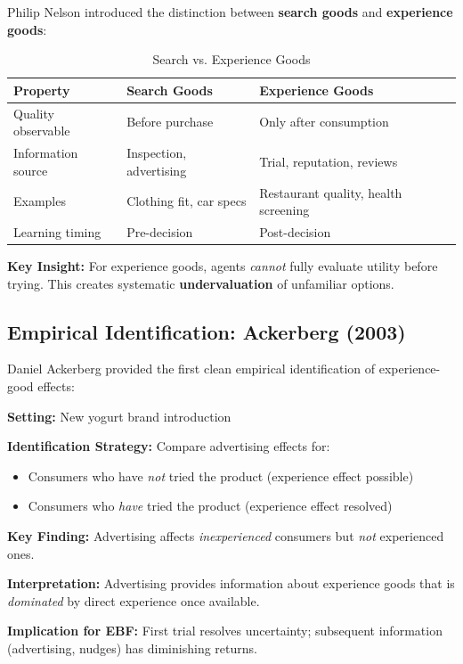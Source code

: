 \documentclass[11pt, a4paper]{article}
\begin{document}
Philip Nelson introduced the distinction between \textbf{search goods} and \textbf{experience goods}:

\begin{table}[htbp]
\centering
\caption{Search vs. Experience Goods}
\label{tab:lrn-search-experience}
\renewcommand{\arraystretch}{1.3}
\begin{tabular}{@{}lll@{}}
\toprule
\textbf{Property} & \textbf{Search Goods} & \textbf{Experience Goods} \\
\midrule
Quality observable & Before purchase & Only after consumption \\
Information source & Inspection, advertising & Trial, reputation, reviews \\
Examples & Clothing fit, car specs & Restaurant quality, health screening \\
Learning timing & Pre-decision & Post-decision \\
\bottomrule
\end{tabular}
\end{table}

\textbf{Key Insight:} For experience goods, agents \textit{cannot} fully evaluate utility before trying. This creates systematic \textbf{undervaluation} of unfamiliar options.

\subsection{Empirical Identification: Ackerberg (2003)}

Daniel Ackerberg provided the first clean empirical identification of experience-good effects:

\begin{tcolorbox}[colback=gray!5!white, colframe=gray!75!black,
    title=Ackerberg (2003): Advertising and Experience Goods]

\textbf{Setting:} New yogurt brand introduction

\textbf{Identification Strategy:} Compare advertising effects for:
\begin{itemize}[nosep]
    \item Consumers who have \textit{not} tried the product (experience effect possible)
    \item Consumers who \textit{have} tried the product (experience effect resolved)
\end{itemize}

\textbf{Key Finding:} Advertising affects \textit{inexperienced} consumers but \textit{not} experienced ones.

\textbf{Interpretation:} Advertising provides information about experience goods that is \textit{dominated} by direct experience once available.

\textbf{Implication for EBF:} First trial resolves uncertainty; subsequent information (advertising, nudges) has diminishing returns.

\end{tcolorbox}
\end{document}
